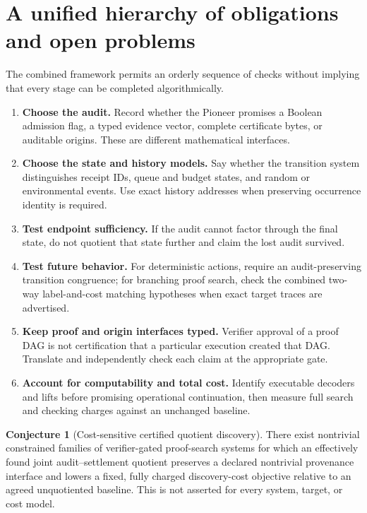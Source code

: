 \documentclass[11pt,letterpaper]{article}
\theoremstyle{definition}
\newtheorem{conjecture}[theorem]{Conjecture}
\begin{document}
\section{A unified hierarchy of obligations and open problems}
The combined framework permits an orderly sequence of checks without implying that every stage can be completed algorithmically.
\begin{enumerate}[label=\arabic*.]
\item \textbf{Choose the audit.} Record whether the Pioneer promises a Boolean admission flag, a typed evidence vector, complete certificate bytes, or auditable origins. These are different mathematical interfaces.
\item \textbf{Choose the state and history models.} Say whether the transition system distinguishes receipt IDs, queue and budget states, and random or environmental events. Use exact history addresses when preserving occurrence identity is required.
\item \textbf{Test endpoint sufficiency.} If the audit cannot factor through the final state, do not quotient that state further and claim the lost audit survived.
\item \textbf{Test future behavior.} For deterministic actions, require an audit-preserving transition congruence; for branching proof search, check the combined two-way label-and-cost matching hypotheses when exact target traces are advertised.
\item \textbf{Keep proof and origin interfaces typed.} Verifier approval of a proof DAG is not certification that a particular execution created that DAG. Translate and independently check each claim at the appropriate gate.
\item \textbf{Account for computability and total cost.} Identify executable decoders and lifts before promising operational continuation, then measure full search and checking charges against an unchanged baseline.
\end{enumerate}

\begin{conjecture}[Cost-sensitive certified quotient discovery]
There exist nontrivial constrained families of verifier-gated proof-search systems for which an effectively found joint audit--settlement quotient preserves a declared nontrivial provenance interface and lowers a fixed, fully charged discovery-cost objective relative to an agreed unquotiented baseline. This is not asserted for every system, target, or cost model.
\end{conjecture}
\end{document}
